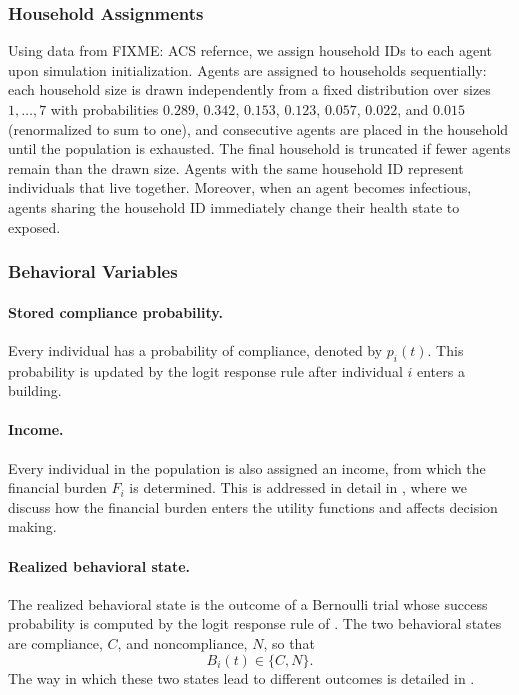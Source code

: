 \documentclass[11pt]{article}
\theoremstyle{definition}
\theoremstyle{plain}
\begin{document}

\subsubsection{Household Assignments}
Using data from {FIXME: ACS refernce}, we assign household IDs to each agent upon simulation initialization. Agents are assigned to households sequentially: each household size is drawn independently from a fixed distribution over sizes $1,\ldots,7$ with probabilities $0.289$, $0.342$, $0.153$, $0.123$, $0.057$, $0.022$, and $0.015$ (renormalized to sum to one), and consecutive agents are placed in the household until the population is exhausted. The final household is truncated if fewer agents remain than the drawn size. Agents with the same household ID represent individuals that live together. Moreover, when an agent becomes infectious, agents sharing the household ID immediately change their health state to exposed. 

\subsubsection{Behavioral Variables}
\paragraph{Stored compliance probability.}

Every individual has a probability of compliance, denoted by $p_i(t)$. This probability is updated by the logit response rule after individual $i$ enters a building.

\paragraph{Income.}

Every individual in the population is also assigned an income, from which the financial burden $F_i$ is determined. This is addressed in detail in , where we discuss how the financial burden enters the utility functions and affects decision making.

\paragraph{Realized behavioral state.}

The realized behavioral state is the outcome of a Bernoulli trial whose success probability is computed by the logit response rule of . The two behavioral states are compliance, $C$, and noncompliance, $N$, so that
\[
B_i(t) \in \{C,N\}.
\]
The way in which these two states lead to different outcomes is detailed in .
\end{document}
